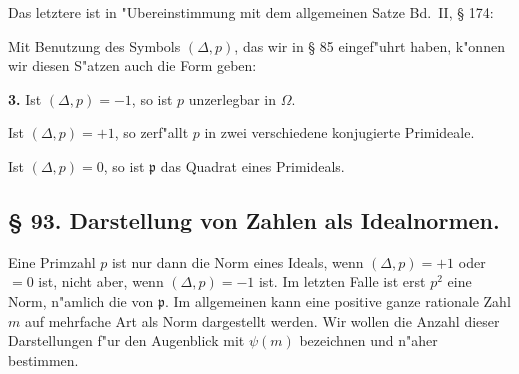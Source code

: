 \documentclass[12pt,a4paper]{article}
\theoremstyle{plain}
\begin{document}
Das letztere ist in "Ubereinstimmung mit dem allgemeinen Satze Bd.~II, \S{} 174:

Mit Benutzung des Symbols $(\Delta, p)$, das wir in \S{} 85 eingef"uhrt haben, k"onnen wir diesen S"atzen auch die Form geben:

\textbf{3.} Ist $(\Delta, p) = -1$, so ist $p$ unzerlegbar in $\Omega$.

\null\qquad Ist $(\Delta, p) = +1$, so zerf"allt $p$ in zwei verschiedene konjugierte Primideale.

\null\qquad Ist $(\Delta, p) = 0$, so ist $\mathfrak{p}$ das Quadrat eines Primideals.

\subsection*{\S{} 93. Darstellung von Zahlen als Idealnormen.}

Eine Primzahl $p$ ist nur dann die Norm eines Ideals, wenn $(\Delta, p) = +1$ oder $= 0$ ist, nicht aber, wenn $(\Delta, p) = -1$ ist. Im letzten Falle ist erst $p^2$ eine Norm, n"amlich die von $\mathfrak{p}$. Im allgemeinen kann eine positive ganze rationale Zahl $m$ auf mehrfache Art als Norm dargestellt werden. Wir wollen die Anzahl dieser Darstellungen f"ur den Augenblick mit $\psi(m)$ bezeichnen und n"aher bestimmen.
\end{document}

